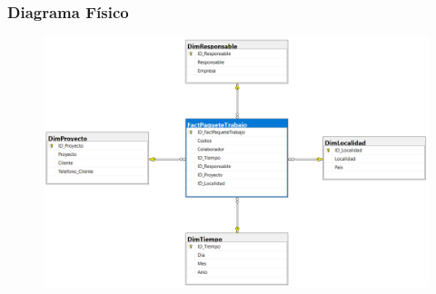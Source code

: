 \documentclass{article}
\begin{document}
\subsubsection{\textbf{Diagrama Físico }}

	\begin{figure}[htb]
		\begin{center}
			\includegraphics[width=12cm]{./images/Ejercicio3_DiagramaFisico}
			
		\end{center}
	\end{figure}

\newpage
\end{document}

